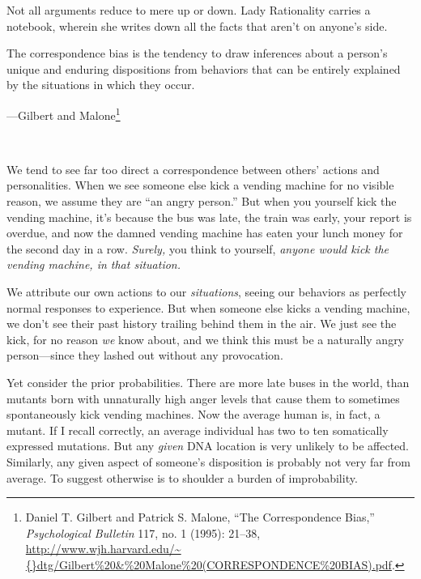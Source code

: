 {
 Not all arguments reduce to mere up or down. Lady Rationality
carries a notebook, wherein she writes down all the facts that
aren't on anyone's side.}

\myendsectiontext


\bigskip


{
 The correspondence bias is the tendency to draw inferences about a
person's unique and enduring dispositions from
behaviors that can be entirely explained by the situations in which
they occur.}

{\raggedleft
 {}---Gilbert and Malone\footnote{Daniel T. Gilbert and Patrick S. Malone, ``The
Correspondence Bias,'' \textit{Psychological
Bulletin} 117, no. 1 (1995): 21--38,
\url{http://www.wjh.harvard.edu/\~{}dtg/Gilbert\%20\&\%20Malone\%20(CORRESPONDENCE\%20BIAS).pdf}.}
\par}


\bigskip

{
 ~}

{
 We tend to see far too direct a correspondence between
others' actions and personalities. When we see someone
else kick a vending machine for no visible reason, we assume they are
``an angry person.'' But when you
yourself kick the vending machine, it's because the bus
was late, the train was early, your report is overdue, and now the
damned vending machine has eaten your lunch money for the second day in
a row. \textit{Surely,} you think to yourself, \textit{anyone would
kick the vending machine, in that situation.}}

{
 We attribute our own actions to our \textit{situations}, seeing
our behaviors as perfectly normal responses to experience. But when
someone else kicks a vending machine, we don't see
their past history trailing behind them in the air. We just see the
kick, for no reason \textit{we} know about, and we think this must be a
naturally angry person---since they lashed out without any
provocation.}

{
 Yet consider the prior probabilities. There are more late buses in
the world, than mutants born with unnaturally high anger levels that
cause them to sometimes spontaneously kick vending machines. Now the
average human is, in fact, a mutant. If I recall correctly, an average
individual has two to ten somatically expressed mutations. But any
\textit{given} DNA location is very unlikely to be affected. Similarly,
any given aspect of someone's disposition is probably
not very far from average. To suggest otherwise is to shoulder a burden
of improbability.}

